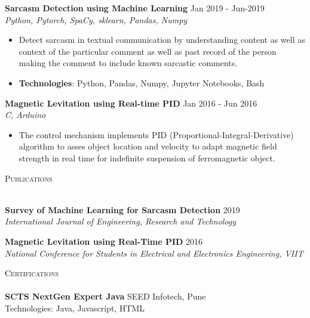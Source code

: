 \documentclass[a4paper]{article}
\newcommand{\lineunder} {
    \vspace*{-8pt} \\
    \hspace*{-18pt} \hrulefill \\
}
\newcommand{\header} [1] {
    {\hspace*{-18pt}\vspace*{6pt} \textsc{#1}}
    \vspace*{-6pt} \lineunder
}
\begin{document}
{\textbf{Sarcasm Detection using Machine Learning}} \hfill Jan 2019 - Jun-2019\\
\textit{Python, Pytorch, SpaCy, sklearn, Pandas, Numpy} \\
\begin{itemize}
  \item Detect sarcasm in textual communication by understanding content as well as context of the particular comment as well as past record of the person making the comment to include known sarcastic comments.\\
  \item \textbf{Technologies}: Python, Pandas, Numpy, Jupyter Notebooks, Bash
\end{itemize}
\vspace*{2mm}

{\textbf{Magnetic Levitation using Real-time PID}} \hfill Jan 2016 - Jun 2016\\
\textit{C, Arduino} \\
\begin{itemize}
  \item The control mechanism implements PID (Proportional-Integral-Derivative) algorithm to asses object location and velocity to adapt magnetic field strength in real time for indefinite suspension of ferromagnetic object.\\
\end{itemize}
\vspace*{2mm}

\header{Publications}
\vspace{1mm}

{\textbf{Survey of Machine Learning for Sarcasm Detection}} \hfill 2019\\
\textit{International Journal of Engineering, Research and Technology} \\
\vspace*{2mm}

{\textbf{Magnetic Levitation using Real-Time PID}} \hfill 2016\\
\textit{National Conference for Students in Electrical and Electronics Engineering, VIIT} \\
\vspace*{2mm}

\header{Certifications}
\vspace{1mm}
\textbf{SCTS NextGen Expert Java} \hfill SEED Infotech, Pune\\
Technologies: Java, Javascript, HTML\\
\vspace*{2mm}
\end{document}
